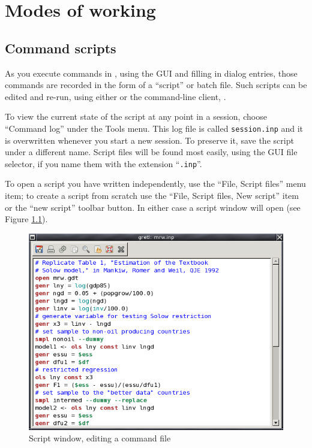 \chapter{Modes of working}
\label{modes}

\section{Command scripts}
\label{scripts}

As you execute commands in , using the GUI and filling in
dialog entries, those commands are recorded in the form of a
``script'' or batch file.  Such scripts can be edited and re-run,
using either  or the command-line client, .

To view the current state of the script at any point in a 
session, choose ``Command log'' under the Tools menu. This log
file is called \verb+session.inp+ and it is overwritten whenever you
start a new session.  To preserve it, save the script under a
different name.  Script files will be found most easily, using the GUI
file selector, if you name them with the extension ``\verb+.inp+''.

To open a script you have written independently, use the ``File,
Script files'' menu item; to create a script from scratch use the
``File, Script files, New script'' item or the ``new script'' toolbar
button.  In either case a script window will open (see Figure
\ref{fig-scriptwin}).

\begin{figure}[htbp]
  \begin{center}
    \includegraphics[scale=0.5]{figures/scriptwin}
  \end{center}
  \caption{Script window, editing a command file}
  \label{fig-scriptwin}
\end{figure}

